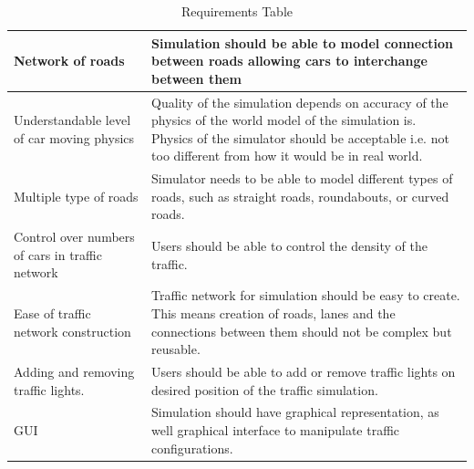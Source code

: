 \documentclass[11pt]{article}
\begin{document}
\begin{center}
\begin{table}[!htb]
\begin{tabular}{|m{4cm}|m{11cm}|}
 \\ \hline
		 Network of roads &  Simulation should be able to model connection between roads allowing cars to interchange between them
 \\ \hline
		 Understandable level of car moving physics &  Quality of the simulation depends on accuracy of the physics of the world model of the simulation is. Physics of the simulator should be acceptable i.e. not too different from how it would be in real world.  \\ \hline
		Multiple type of roads & Simulator needs to be able to model different types of roads, such as straight roads, roundabouts, or curved roads.
 \\ \hline
		 Control over numbers of cars in traffic network & Users should be able to control the density of the traffic.\\ \hline
		 Ease of traffic network construction & Traffic network for simulation should be easy to create. This means creation of roads, lanes and the connections between them should not be complex but reusable.\\ \hline
		 Adding and removing traffic lights. & Users should be able to add or remove traffic lights on desired position of the traffic simulation.\\ \hline
		 GUI & Simulation should have graphical representation, as well graphical interface to manipulate traffic configurations.  \\ \hline
	\end{tabular}
	\caption{Requirements Table}
	\label{table:RequriementsTable}
	\end{table}
\end{center}
\end{document}
